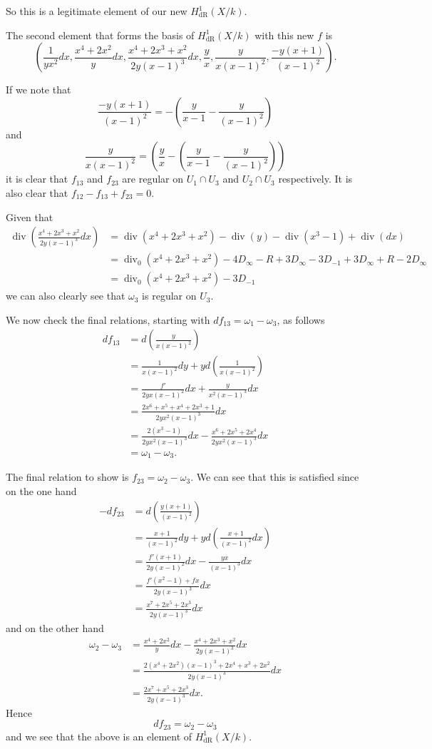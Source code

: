 \documentclass[draft, 11pt]{article} %
\theoremstyle{plain}
\theoremstyle{remark}
\newcommand{\derhamhone}{H_{\text {dR}}^1(X/k)}
\DeclareMathOperator{\di}{div}
\begin{document}
So this is a legitimate element of our new $\derhamhone$.

The second element that forms the basis of $\derhamhone$ with this new $f$ is
\[
\left( \frac{1}{yx^2}dx, \frac{x^4+2x^2}{y}dx, \frac{x^4 + 2x^3 + x^2}{2y(x-1)^3}dx, \frac{y}{x}, \frac{y}{x(x-1)^2}, \frac{-y(x+1)}{(x-1)^2} \right).
\]

If we note that
\[
\frac{-y(x+1)}{(x-1)^2} = - \left( \frac{y}{x-1} - \frac{y}{(x-1)^2} \right)
\]
and
\[
\frac{y}{x(x-1)^2} = \left(\frac{y}{x} - \left( \frac{y}{x-1} - \frac{y}{(x-1)^2} \right)\right)
\]
it is clear that $f_{13}$ and $f_{23}$ are regular on $U_1 \cap U_3$ and $U_2 \cap U_3$ respectively.
It is also clear that $f_{12} - f_{13} + f_{23} = 0$.

Given that
\begin{align}
\di \left( \frac{x^4 + 2x^3 + x^2}{2y(x-1)^3}dx \right) & = \di( x^4 + 2x^3+x^2) - \di(y) - \di(x^3-1) + \di(dx) \\
& = \di_0(x^4+2x^3+x^2) - 4D_\infty - R + 3D_\infty - 3D_{-1} + 3D_\infty + R - 2D_\infty \\
& = \di_0(x^4+2x^3+x^2) -3D_{-1}
\end{align}
we can also clearly see that $\omega_3$ is regular on $U_3$.

We now check the final relations, starting with $df_{13} = \omega_1 - \omega_3$, as follows
\begin{align}
df_{13} & = d \left( \frac{y}{x(x-1)^2} \right) \\
& = \frac{1}{x(x-1)^2}dy + y d \left( \frac{1}{x(x-1)^2} \right) \\
& = \frac{f'}{2yx(x-1)^2}dx + \frac{y}{x^2(x-1)^3}dx \\
& = \frac{2x^6 + x^5 + x^4 + 2x^3 + 1}{2yx^2(x-1)^3} dx\\
& = \frac{2(x^3-1)}{2yx^2(x-1)^3}dx - \frac{x^6 + 2x^5 + 2x^4}{2yx^2(x-1)^3}dx \\
& = \omega_1 - \omega_3.
\end{align}

The final relation to show is $f_{23} = \omega_2 - \omega_3$.
We can see that this is satisfied since on the one hand
\begin{align}
- df_{23} & = d \left( \frac{y(x+1)}{(x-1)^2} \right) \\
& = \frac{x+1}{(x-1)^2}dy + y d \left( \frac{x+1}{(x-1)^2}dx \right) \\
& = \frac{f'(x+1)}{2y(x-1)^2}dx - \frac{yx}{(x-1)^3} dx \\
& = \frac{f'(x^2-1) +fx}{2y(x-1)^3}dx \\
& = \frac{x^7 + 2x^5 + 2x^3}{2y(x-1)^3}dx
\end{align}
and on the other hand
\begin{align}
\omega_2 - \omega_3 & = \frac{x^4 + 2x^2}{y}dx - \frac{x^4 + 2x^3 + x^2}{2y(x-1)^3} dx \\
& = \frac{2(x^4 + 2x^2)(x-1)^3 + 2x^4 + x^3 + 2x^2}{2y(x-1)^3}dx \\
& = \frac{2x^7 + x^5 + 2x^3}{2y(x-1)^3}dx.
\end{align}
Hence
\[
df_{23} = \omega_2 - \omega_3
\]
and we see that the above is an element of $\derhamhone$.
\end{document}
